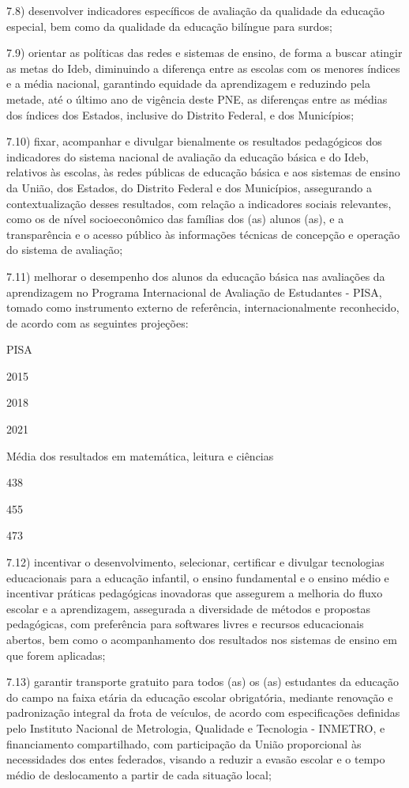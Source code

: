 \documentclass[
]{book}
\begin{document}
7.8) desenvolver indicadores específicos de avaliação da qualidade da educação especial, bem como da qualidade da educação bilíngue para surdos;

7.9) orientar as políticas das redes e sistemas de ensino, de forma a buscar atingir as metas do Ideb, diminuindo a diferença entre as escolas com os menores índices e a média nacional, garantindo equidade da aprendizagem e reduzindo pela metade, até o último ano de vigência deste PNE, as diferenças entre as médias dos índices dos Estados, inclusive do Distrito Federal, e dos Municípios;

7.10) fixar, acompanhar e divulgar bienalmente os resultados pedagógicos dos indicadores do sistema nacional de avaliação da educação básica e do Ideb, relativos às escolas, às redes públicas de educação básica e aos sistemas de ensino da União, dos Estados, do Distrito Federal e dos Municípios, assegurando a contextualização desses resultados, com relação a indicadores sociais relevantes, como os de nível socioeconômico das famílias dos (as) alunos (as), e a transparência e o acesso público às informações técnicas de concepção e operação do sistema de avaliação;

7.11) melhorar o desempenho dos alunos da educação básica nas avaliações da aprendizagem no Programa Internacional de Avaliação de Estudantes - PISA, tomado como instrumento externo de referência, internacionalmente reconhecido, de acordo com as seguintes projeções:

PISA

2015

2018

2021

Média dos resultados em matemática, leitura e ciências

438

455

473

7.12) incentivar o desenvolvimento, selecionar, certificar e divulgar tecnologias educacionais para a educação infantil, o ensino fundamental e o ensino médio e incentivar práticas pedagógicas inovadoras que assegurem a melhoria do fluxo escolar e a aprendizagem, assegurada a diversidade de métodos e propostas pedagógicas, com preferência para softwares livres e recursos educacionais abertos, bem como o acompanhamento dos resultados nos sistemas de ensino em que forem aplicadas;

7.13) garantir transporte gratuito para todos (as) os (as) estudantes da educação do campo na faixa etária da educação escolar obrigatória, mediante renovação e padronização integral da frota de veículos, de acordo com especificações definidas pelo Instituto Nacional de Metrologia, Qualidade e Tecnologia - INMETRO, e financiamento compartilhado, com participação da União proporcional às necessidades dos entes federados, visando a reduzir a evasão escolar e o tempo médio de deslocamento a partir de cada situação local;
\end{document}
